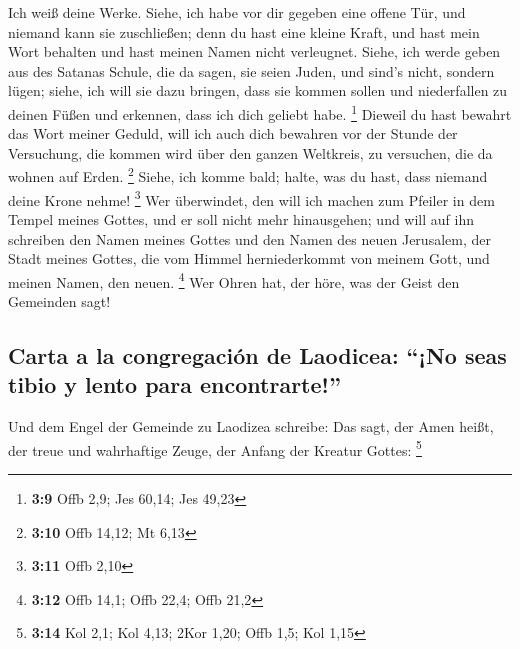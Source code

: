  Ich weiß deine Werke. Siehe, ich habe vor dir gegeben
eine offene Tür, und niemand kann sie zuschließen; denn du hast eine
kleine Kraft, und hast mein Wort behalten und hast meinen Namen nicht
verleugnet.  Siehe, ich werde geben aus des Satanas
Schule, die da sagen, sie seien Juden, und sind's nicht, sondern lügen;
siehe, ich will sie dazu bringen, dass sie kommen sollen und
niederfallen zu deinen Füßen und erkennen, dass ich dich geliebt habe.
\footnote{\textbf{3:9} Offb 2,9; Jes 60,14; Jes 49,23} 
Dieweil du hast bewahrt das Wort meiner Geduld, will ich auch dich
bewahren vor der Stunde der Versuchung, die kommen wird über den ganzen
Weltkreis, zu versuchen, die da wohnen auf Erden. \footnote{\textbf{3:10}
  Offb 14,12; Mt 6,13}  Siehe, ich komme bald; halte, was
du hast, dass niemand deine Krone nehme! \footnote{\textbf{3:11} Offb
  2,10}  Wer überwindet, den will ich machen zum Pfeiler
in dem Tempel meines Gottes, und er soll nicht mehr hinausgehen; und
will auf ihn schreiben den Namen meines Gottes und den Namen des neuen
Jerusalem, der Stadt meines Gottes, die vom Himmel herniederkommt von
meinem Gott, und meinen Namen, den neuen. \footnote{\textbf{3:12} Offb
  14,1; Offb 22,4; Offb 21,2}  Wer Ohren hat, der höre,
was der Geist den Gemeinden sagt!

\hypertarget{carta-a-la-congregaciuxf3n-de-laodicea-no-seas-tibio-y-lento-para-encontrarte}{%
\subsection{Carta a la congregación de Laodicea: ``¡No seas tibio y
lento para
encontrarte!''}\label{carta-a-la-congregaciuxf3n-de-laodicea-no-seas-tibio-y-lento-para-encontrarte}}

 Und dem Engel der Gemeinde zu Laodizea schreibe: Das
sagt, der Amen heißt, der treue und wahrhaftige Zeuge, der Anfang der
Kreatur Gottes: \footnote{\textbf{3:14} Kol 2,1; Kol 4,13; 2Kor 1,20;
  Offb 1,5; Kol 1,15}

